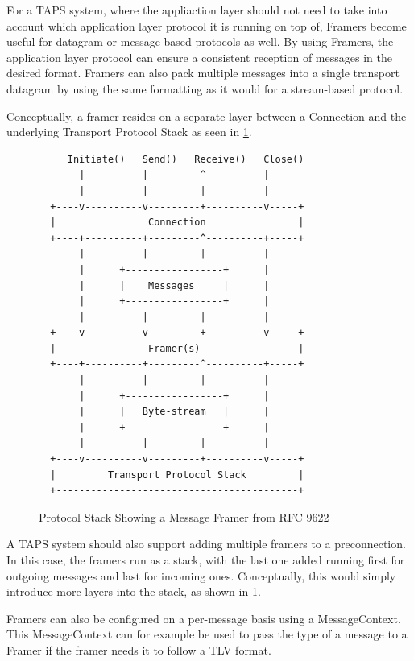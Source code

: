 For a TAPS system, where the appliaction layer should not need to take into
account which application layer protocol it is running on top of, Framers become
useful for datagram or message-based protocols as well. By using Framers, the
application layer protocol can ensure a consistent reception of messages in
the desired format. Framers can also pack multiple messages into a single transport
datagram by using the same formatting as it would for a stream-based protocol.

Conceptually, a framer resides on a separate layer between a Connection and the
underlying Transport Protocol Stack as seen in \cref{fig:tpsStack}.

\begin{figure}[p]
  \begin{lstlisting}
     Initiate()   Send()   Receive()   Close()
       |          |         ^          |
       |          |         |          |
  +----v----------v---------+----------v-----+
  |                Connection                |
  +----+----------+---------^----------+-----+
       |          |         |          |
       |      +-----------------+      |
       |      |    Messages     |      |
       |      +-----------------+      |
       |          |         |          |
  +----v----------v---------+----------v-----+
  |                Framer(s)                 |
  +----+----------+---------^----------+-----+
       |          |         |          |
       |      +-----------------+      |
       |      |   Byte-stream   |      |
       |      +-----------------+      |
       |          |         |          |
  +----v----------v---------+----------v-----+
  |         Transport Protocol Stack         |
  +------------------------------------------+
  \end{lstlisting}
\caption{Protocol Stack Showing a Message Framer from RFC 9622 \cite{trammellAbstractApplicationProgramming2025}}
\label{fig:tpsStack}
\end{figure}

A TAPS system should also support adding multiple framers to a preconnection.
In this case, the framers run as a stack, with the last one added running first
for outgoing messages and last for incoming ones. Conceptually, this would
simply introduce more layers into the stack, as shown in \cref{fig:tpsStack}.

Framers can also be configured on a per-message basis using a MessageContext.
This MessageContext can for example be used to pass the type of a message
to a Framer if the framer needs it to follow a TLV format.

